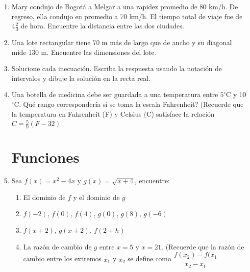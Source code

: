 \documentclass[10pt,twoside]{article}
\begin{document}
\begin{enumerate}
\item Mary condujo de Bogotá a Melgar a una rapidez promedio de 80 km/h. De regreso, ella condujo en promedio a 70 km/h. El tiempo total de viaje fue de $4\frac{2}{3}$ de hora. Encuentre la distancia entre las dos ciudades.
\item Una lote rectangular tiene 70 m más de largo que de ancho y su diagonal mide 130 m. Encuentre las dimensiones del lote.
\item Solucione cada inecuación. Escriba la respuesta usando la notación de intervalos y dibuje la solución en la recta real.
\begin{enumerate}
\end{enumerate}
\item Una botella de medicina debe ser guardada a una temperatura entre $5^{\circ}$C y 10$^{\circ}$C. Qué rango correspondería si se toma la escala Fahrenheit? (Recuerde que la temperatura en Fahrenheit (F) y Celsius (C) satisface la relación $C=\frac{5}{9}(F-32)$
\section*{Funciones}
\item Sea $f(x)=x^{2}-4x$ y $g(x)=\sqrt{x+4}$, encuentre:
\begin{enumerate}
\item El dominio de $f$ y el dominio de $g$
\item $f(-2)$, $f(0)$, $f(4)$, $g(0)$, $g(8)$, $g(-6)$
\item $f(x+2)$, $g(x+2)$, $f(2+h)$
\item La razón de cambio de $g$ entre $x=5$ y $x=21$. (Recuerde que la razón de cambio entre los extremos $x_{1}$ y $x_{2}$ se define como $\dfrac{f(x_{2})-f(x_{1}}{x_{2}-x_{1}}$
\end{enumerate}
\end{enumerate}
\end{document}
